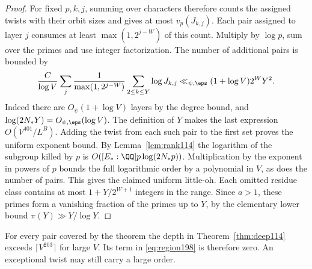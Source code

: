 \documentclass[a4paper,11pt]{article}
\theoremstyle{definition}
\theoremstyle{remark}
\numberwithin{equation}{section}
\begin{document}
\begin{proof}
For fixed \(p,k,j\), summing over characters therefore counts the
assigned twists with their orbit sizes and gives at most \(v_p(J_{k,j})\).
Each pair assigned to layer \(j\) consumes at least
\(\max(1,2^{j-W})\) of this count. Multiply by \(\log p\), sum over
the primes and use integer factorization. The number of additional
pairs is bounded by
\[
 \frac{C}{\log V}\sum_j\frac{1}{\max(1,2^{j-W})}
           \sum_{2\le k\le Y}\log J_{k,j}
 \ll_{\psi,\eps}(1+\log V)2^W Y^2.
\]
Indeed there are \(O_\psi(1+\log V)\) layers by the degree bound,
and \(\log(2N_*Y)=O_{\psi,\eps}(\log V)\). The definition of \(Y\)
makes the last expression \(O(V^{401}/L^B)\). Adding the twist from
each such pair to the first set proves the uniform exponent bound.
By Lemma~\ref{lem:rank114} the logarithm of the subgroup killed by
\(p\) is \(O([E_*:\QQ]p\log(2N_*p))\). Multiplication by the exponent
in powers of \(p\) bounds the full logarithmic order by a polynomial
in \(V\), as does the number of pairs. This gives the claimed uniform
little-oh. Each omitted residue class contains at most
\(1+Y/2^{W+1}\) integers in the range. Since \(a>1\), these primes
form a vanishing fraction of the primes up to \(Y\), by the elementary
lower bound \(\pi(Y)\gg Y/\log Y\).
\end{proof}

For every pair covered by the theorem the depth in
Theorem~\ref{thm:deep114} exceeds \(\lceil V^{203}\rceil\) for large
\(V\). Its term in \eqref{eq:region198} is therefore zero. An
exceptional twist may still carry a large order.
\end{document}
